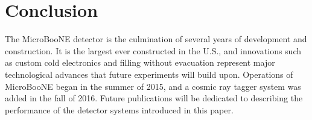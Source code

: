 \section{Conclusion}
\label{sec:conclusion}

The MicroBooNE detector is the culmination of several years of development and construction.  It is the largest \lartpc ever constructed in the U.S., and innovations such as custom cold electronics and filling without evacuation represent major technological advances that future experiments will build upon.  Operations of MicroBooNE began in the summer of 2015, and a cosmic ray tagger system was added in the fall of 2016.  Future publications will be dedicated to describing the performance of the detector systems introduced in this paper.